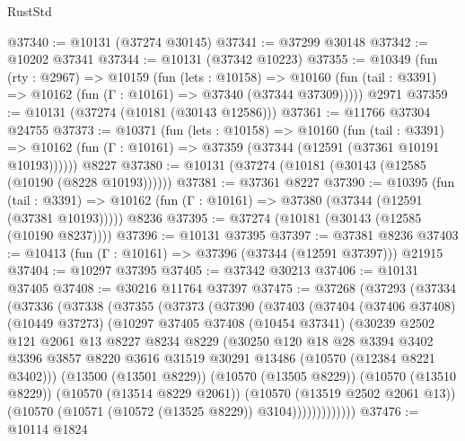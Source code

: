 \begin{lexlean}{RustStd}
\begin{coremodule}
@37340 := @10131 (@37274 @30145)
@37341 := @37299 @30148
@37342 := @10202 @37341
@37344 := @10131 (@37342 @10223)
@37355 := @10349
    (fun (rty : @2967) =>
    @10159
      (fun (lets : @10158) =>
      @10160 (fun (tail : @3391) => @10162 (fun (Γ : @10161) => @37340 (@37344 @37309)))))
    @2971
@37359 := @10131 (@37274 (@10181 (@30143 @12586)))
@37361 := @11766 @37304 @24755
@37373 := @10371
    (fun (lets : @10158) =>
    @10160
      (fun (tail : @3391) =>
      @10162 (fun (Γ : @10161) => @37359 (@37344 (@12591 (@37361 @10191 @10193))))))
    @8227
@37380 := @10131 (@37274 (@10181 (@30143 (@12585 (@10190 (@8228 @10193))))))
@37381 := @37361 @8227
@37390 := @10395
    (fun (tail : @3391) => @10162 (fun (Γ : @10161) => @37380 (@37344 (@12591 (@37381 @10193)))))
    @8236
@37395 := @37274 (@10181 (@30143 (@12585 (@10190 @8237))))
@37396 := @10131 @37395
@37397 := @37381 @8236
@37403 := @10413 (fun (Γ : @10161) => @37396 (@37344 (@12591 @37397))) @21915
@37404 := @10297 @37395
@37405 := @37342 @30213
@37406 := @10131 @37405
@37408 := @30216 @11764 @37397
@37475 := @37268
    (@37293
      (@37334
        (@37336
          (@37338
            (@37355
              (@37373
                (@37390
                  (@37403
                    (@37404
                      (@37406 @37408)
                      (@10449 @37273)
                      (@10297
                        @37405
                        @37408
                        (@10454 @37341)
                        (@30239
                          @2502
                          @121
                          @2061
                          @13
                          @8227
                          @8234
                          @8229
                          (@30250
                            @120
                            @18
                            @28
                            @3394
                            @3402
                            @3396
                            @3857
                            @8220
                            @3616
                            @31519
                            @30291
                            @13486
                            (@10570 (@12384 @8221 @3402)))
                          (@13500 (@13501 @8229))
                          (@10570 (@13505 @8229))
                          (@10570 (@13510 @8229))
                          (@10570 (@13514 @8229 @2061))
                          (@10570 (@13519 @2502 @2061 @13))
                          (@10570 (@10571 (@10572 (@13525 @8229)) @3104)))))))))))))
@37476 := @10114 @1824

\end{coremodule}
\end{lexlean}
